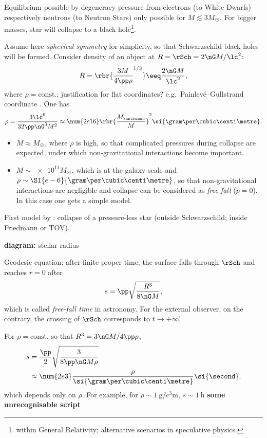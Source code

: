 \begin{nameddef}{ }
Equilibrium possible by degeneracy pressure from electrons (to White Dwarfs)
respectively neutrons (to Neutron Stars) only possible for $M \lesssim 3
M_\astrosun$. For bigger masses, star will collapse to a black hole\footnote{%
within General Relativity; alternative scenarios in speculative physics.}.

Assume here \emph{spherical symmetry} for simplicity, so that Schwarzschild
black holes will be formed. Consider density of an object at $R = \rSch = 2\nG
M/\lc^2$:
\begin{equation}
R = \rbr{\frac{3M}{4\pp\rho}^{1/3}} \eeq \frac{2\nG M}{\lc^2},
\end{equation}
where $\rho = \text{const.}$; justification for flat coordinates? e.g.\
Painlevé--Gullstrand coordinate \cite{painleve1921mecanique,%
Gullstrand:1922tfa}. One has
\begin{equation}
\rho = \frac{3\lc^6}{32\pp\nG^3 M^2}\approx \num{2e16}\rbr{\frac{M_\astrosun}%
{M}}^2\si{\gram\per\cubic\centi\metre}.
\end{equation}
\begin{itemize}
\item
$M \approx M_\astrosun$, where $\rho$ is high, so that complicated pressures
during collapse are expected, under which non-gravitational interactions
become important.
\item
$M\sim\num{e11}M_\astrosun$, which is at the galaxy scale and $\rho\sim\SI{%
e-6}{\gram\per\cubic\centi\metre}$, so that non-gravitational interactions
are negligible and collapse can be considered as \emph{free fall} ($p=0$).
In this case one gets a simple model.
\end{itemize}

First model by \citeauthor{PhysRev.56.455} \cite{PhysRev.56.455}: collapse
of a pressure-less star (outside Schwarzschild; inside Friedmann or TOV).

\textbf{diagram:} stellar radius

Geodesic equation: after finite proper time, the surface falls through $\rSch$
and reaches $r = 0$ after
\begin{equation}
s = \pp\sqrt{\frac{R^3}{8\nG M}},
\end{equation}
which is called \emph{free-fall time} in astronomy.
For the external observer, on the contrary, the crossing of $\rSch$
corresponds to $t\to+\infty$!

For $\rho = \text{const.}$ so that $R^3 = 3\nG M/4\pp\rho$,
\begin{align}
s &= \frac{\pp}{2}\sqrt{\frac{3}{8\pp\nG M\rho}} \\
&\approx \num{2e3}\frac{\rho}{\si{\gram\per\cubic\centi\metre}}\si{\second},
\end{align}
which depends only on $\rho$. For example, for $\rho\sim\SI{1}{\gram\per%
\cubic\centi\metre}$, $s\sim\SI{1}{\hour}$ \textbf{some unrecognisable script}

\end{nameddef} %

